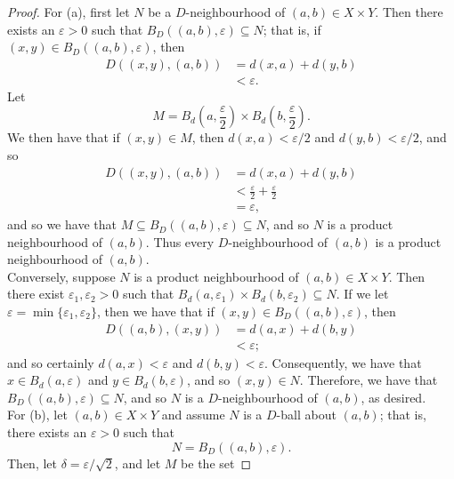 \documentclass[12pt]{article}
\begin{document}
\begin{proof}
  For (a), first let $N$ be a $D$-neighbourhood of $(a,b)\in X\times Y$.
  Then there exists an $\varepsilon>0$ such that 
  $B_D\left( (a,b), \varepsilon\right)\subseteq N$; that is, if
  $(x,y)\in B_D\left( (a,b),\varepsilon \right)$, then 
  \begin{align*}
    D\left( (x,y),(a,b) \right) &= d(x,a) + d(y,b) \\
    &< \varepsilon.
  \end{align*}
  Let $$M=\displaystyle B_d\left(a,\frac{\varepsilon}{2}\right)
  \times B_d\left(b,\frac{\varepsilon}{2}\right).$$
  We then have that if $(x,y)\in M$, then $d(x,a)<\varepsilon/2$ and 
  $d(y,b)<\varepsilon/2$, and so 
  \begin{align*}
    D\left( (x,y),(a,b) \right) &= d(x,a) + d(y,b) \\
    &< \frac{\varepsilon}{2} + \frac{\varepsilon}{2} \\
      &= \varepsilon,
  \end{align*}
  and so we have that $M\subseteq B_D\left( (a,b),\varepsilon \right)
  \subseteq N$, and so $N$ is a product neighbourhood of $(a,b)$.
  Thus every $D$-neighbourhood of $(a,b)$ is a product neighbourhood of 
  $(a,b)$. \\
  \indent Conversely, suppose $N$ is a product neighbourhood of 
  $(a,b)\in X\times Y$.
  Then there exist $\varepsilon_1,\varepsilon_2>0$ such that
  $B_d(a,\varepsilon_1)\times B_d(b,\varepsilon_2)\subseteq N$.
  If we let $\varepsilon=\min\{\varepsilon_1,\varepsilon_2\}$, then we have
  that if $(x,y)\in B_D\left( (a,b),\varepsilon \right)$, then
  \begin{align*}
    D\left( (a,b),(x,y) \right) &= d(a,x) + d(b,y) \\
    &< \varepsilon;
  \end{align*}
  and so certainly $d(a,x)<\varepsilon$ and $d(b,y)<\varepsilon$.
  Consequently, we have that $x\in B_d(a,\varepsilon)$ and
  $y\in B_d(b,\varepsilon)$, and so 
  $(x,y)\in N$.
  Therefore, we have that $B_D\left( (a,b),\varepsilon \right)\subseteq N$,
  and so $N$ is a $D$-neighbourhood of $(a,b)$, as desired.\\
  \indent
  For (b), let $(a,b)\in X\times Y$ and assume $N$ is a $D$-ball about
  $(a,b)$; that is, there exists an $\varepsilon>0$ such that
  \begin{equation*}
    N=B_D\left( (a,b),\varepsilon \right).
  \end{equation*}
  Then, let $\delta = \varepsilon/\sqrt2$, and let $M$ be the set

\end{proof}
\end{document}
